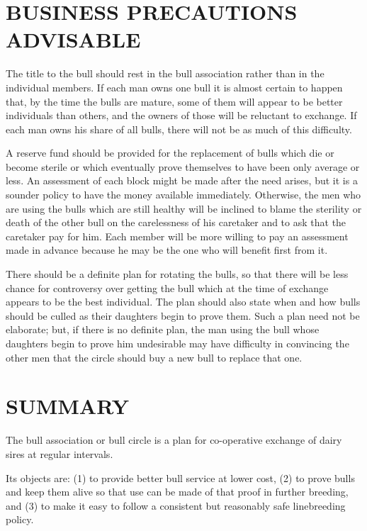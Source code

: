 \section*{BUSINESS PRECAUTIONS ADVISABLE}

The title to the bull should rest in the bull association rather than
in the individual members. If each man owns one bull it is almost certain
to happen that, by the time the bulls are mature, some of them will
appear to be better individuals than others, and the owners of those
will be reluctant to exchange. If each man owns his share of all bulls,
there will not be as much of this difficulty.

A reserve fund should be provided for the replacement of bulls
which die or become sterile or which eventually prove themselves to
have been only average or less. An assessment of each block might be
made after the need arises, but it is a sounder policy to have the money
available immediately. Otherwise, the men who are using the bulls
which are still healthy will be inclined to blame the sterility or death of
the other bull on the carelessness of his caretaker and to ask that the
caretaker pay for him. Each member will be more willing to pay an
assessment made in advance because he may be the one who will benefit
first from it.

There should be a definite plan for rotating the bulls, so that there
will be less chance for controversy over getting the bull which at the
time of exchange appears to be the best individual. The plan should
also state when and how bulls should be culled as their daughters begin
to prove them. Such a plan need not be elaborate; but, if there is no
definite plan, the man using the bull whose daughters begin to prove
him undesirable may have difficulty in convincing the other men that
the circle should buy a new bull to replace that one.

\section*{SUMMARY}

The bull association or bull circle is a plan for co-operative
exchange of dairy sires at regular intervals.

Its objects are: (1) to provide better bull service at lower cost, (2) to
prove bulls and keep them alive so that use can be made of that proof
in further breeding, and (3) to make it easy to follow a consistent but
reasonably safe linebreeding policy.

